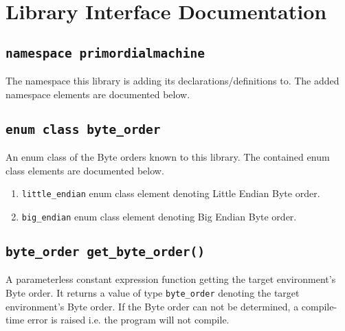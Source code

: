 \documentclass[oneside]{book}
\begin{document}


\chapter{Library Interface Documentation}
\section{\texttt{namespace primordialmachine}}
The namespace this library is adding its declarations/definitions to.
The added namespace elements are documented below.

\section{\texttt{enum class byte\_order}}
An enum class of the Byte orders known to this library.
The contained enum class elements are documented below.
\begin{enumerate}
\item \texttt{little\_endian} enum class element denoting Little Endian Byte order.
\item \texttt{big\_endian} enum class element denoting Big Endian Byte order.
\end{enumerate}

\section{\texttt{byte\_order get\_byte\_order()}}
A parameterless constant expression function getting the target environment's Byte order. It returns
a value of type \lstinline{byte_order} denoting the target environment's Byte order.     If the Byte
order can not be determined, a compile-time error is raised i.e. the program will not       compile.
\end{document}
